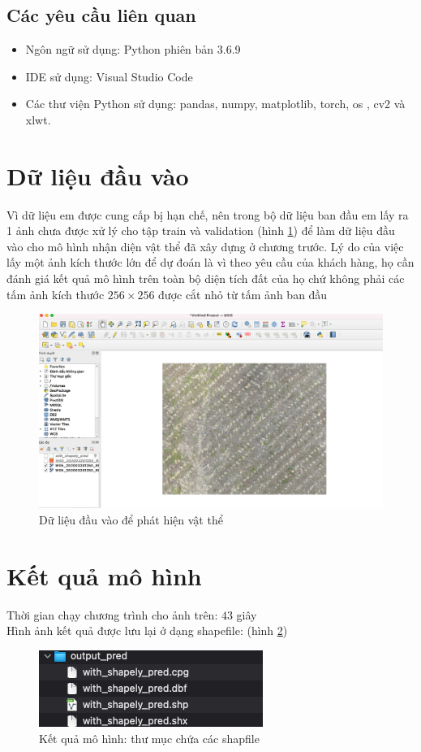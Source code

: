 \documentclass[a4paper, 12pt]{report}
\begin{document}
\subsection{Các yêu cầu liên quan}
\begin{itemize}
	\item Ngôn ngữ sử dụng: Python phiên bản 3.6.9
	\item IDE sử dụng: Visual Studio Code
	\item Các thư viện Python sử dụng: pandas, numpy, matplotlib,  torch, os , cv2 và xlwt.
\end{itemize}



\section{Dữ liệu đầu vào}
Vì dữ liệu em được cung cấp bị hạn chế, nên trong bộ dữ liệu ban đầu em lấy ra 1 ảnh chưa được xử lý cho tập train và validation (hình \ref{fig:demo}) để làm dữ liệu đầu vào cho mô hình nhận diện vật thể đã xây dựng ở chương trước.  Lý do của việc lấy một ảnh kích thước lớn để dự đoán là vì theo yêu cầu của khách hàng,  họ cần đánh giá kết quả mô hình trên toàn bộ diện tích đất của họ chứ không phải các tấm ảnh kích thước $256 \times 256$ được cắt nhỏ từ tấm ảnh ban đầu
 \begin{figure}[!h]
	\centering
	\includegraphics[width=1\linewidth]{Images/demo}
	\caption{Dữ liệu đầu vào để phát hiện vật thể}
	\label{fig:demo}
\end{figure}

\section{Kết quả mô hình}
Thời gian chạy chương trình cho ảnh trên: $43$ giây \\
Hình ảnh kết quả được lưu lại ở dạng shapefile: 	(hình \ref{fig:shpfile_demo_result})
 \begin{figure}[!h]
	\centering
	\includegraphics[width=0.5\linewidth]{Images/shpfile_demo_result}
	\caption{Kết quả mô hình: thư mục chứa các shapfile}
	\label{fig:shpfile_demo_result}
\end{figure}
\end{document}
